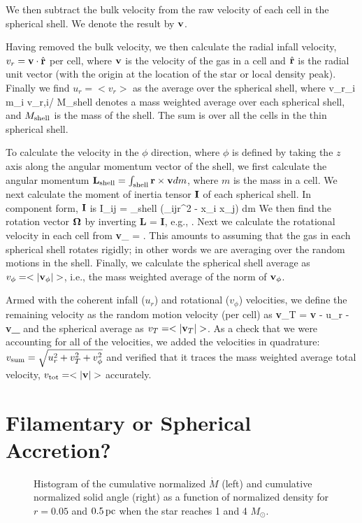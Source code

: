\documentclass[../dissertation.tex]{subfiles}
\begin{document}
We then subtract the bulk velocity from the raw velocity of each cell in the spherical shell. We denote the result by ${\bf v}$.

Having removed the bulk velocity, we then calculate the radial infall velocity, $v_r = {\bf v}\cdot\hat{\bf r}$ per cell, where ${\bf v}$ is the velocity of the gas in a cell and $\hat{\bf r}$ is the radial unit vector (with the origin at the location of the star or local density peak).  Finally we find $u_r = <v_r>$ as the average over the spherical shell, where
%
\be 
\langle v_r\rangle \equiv \Sigma_i m_i v_{r,i}/ M_{\rm shell}
\ee
%
denotes a mass weighted average over each spherical shell, and $M_{\rm shell}$ is the mass of the shell. The sum is over all the cells in the thin spherical shell.

To calculate the velocity in the $\phi$ direction, where $\phi$ is defined by taking the $z$ axis along the angular momentum vector of the shell, we first calculate the angular momentum ${\bf L}_{\rm shell} = \int_{\rm shell} {\bf r} \times {\bf v} dm$, where $m$ is the mass in a cell. We next calculate the moment of inertia tensor ${\bf I}$ of each spherical shell.  In component form, ${\bf I}$ is
\be
I_{ij} = \int_{\rm shell} (\delta_{ij}r^2 - x_i x_j) dm
\label{eq:hydro_moment of inertia}
\ee
%
We then find the rotation vector ${\bf \Omega}$ by inverting
%
\be
{\bf L} = {\bf I}{\bf \Omega},
\ee
%
e.g., \citep{1992ApJ...399..551M}.
Next we calculate the rotational velocity in each cell from 
%
\be
{\bf v}_{\phi} = {\bf \Omega} .
\label{eq:hydro_calc v_phi}
\ee
%
This amounts to assuming that the gas in each spherical shell rotates rigidly; in other words we are averaging over the random motions in the shell. 
Finally, we calculate the spherical shell average as $v_{\phi} = <|{\bf v}_{\phi}|>$, i.e., the mass weighted average of the norm of ${\bf v}_{\phi}$.  

Armed with the coherent infall ($u_r$) and rotational ($v_{\phi}$) velocities, we define the remaining velocity as the random motion velocity (per cell) as 
\be
{\bf v}_T = {\bf v} - u_r - {\bf v_{\phi}}
\ee
and the spherical average as $v_T = <|{\bf v}_T|>$. 
As a check that we were accounting for all of the velocities, we added the velocities in quadrature: $v_{\rm sum} = \sqrt{u_r^2 + v_T^2 + v_{\phi}^2}$ and verified that it traces the mass weighted average total velocity, $v_{\rm tot} = <|{\bf v}|>$ accurately.



\section{Filamentary or Spherical Accretion?}
\begin{figure*}[htb]%
\caption[Hydro Normalized $\dot{M}$ and Normalized Solid Angle]{Histogram of the cumulative normalized $\dot{M}$ (left) and cumulative normalized solid angle (right) as a function of normalized density for $r=0.05$ and $0.5\,\rm pc$ when the star reaches 1 and 4 $M_{\odot}$. \label{fig:hydro_Accretion_avg}}
\end{figure*}
\end{document}

